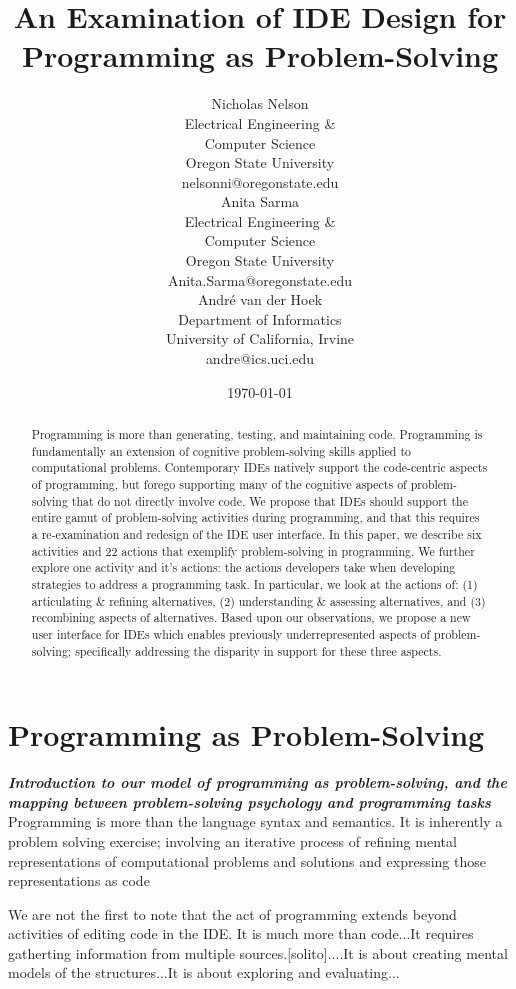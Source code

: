 \documentclass{ppig}
\title{An Examination of IDE Design for Programming as Problem-Solving}
\author{Nicholas Nelson \\
  Electrical Engineering \&\\ Computer Science \\
  Oregon State University \\
  nelsonni@oregonstate.edu \\
  \And
  Anita Sarma \\
  Electrical Engineering \&\\ Computer Science \\
  Oregon State University \\
  Anita.Sarma@oregonstate.edu \\
  \And
  André van der Hoek \\
  Department of Informatics \\
  University of California, Irvine \\
  andre@ics.uci.edu
}
\date{\today}
\newcommand{\bold}[1]{\textit{\textbf{\color{aoblue}#1}}} %
\begin{document}
\maketitle
\thispagestyle{empty}

\begin{abstract}

Programming is more than generating, testing, and maintaining code.
Programming is fundamentally an extension of cognitive problem-solving skills applied to computational problems.
Contemporary IDEs natively support the code-centric aspects of programming, but forego supporting many of the cognitive aspects of problem-solving that do not directly involve code.
We propose that IDEs should support the entire gamut of problem-solving activities during programming, and that this requires a re-examination and redesign of the IDE user interface.
In this paper, we describe six activities and 22 actions that exemplify problem-solving in programming.
We further explore one activity and it's actions: the actions developers take when developing strategies to address a programming task.
In particular, we look at the actions of: (1) articulating \& refining alternatives, (2) understanding \& assessing alternatives, and (3) recombining aspects of alternatives.
Based upon our observations, we propose a new user interface for IDEs which enables previously underrepresented aspects of problem-solving; specifically addressing the disparity in support for these three aspects. 
\end{abstract}

\section{Programming as Problem-Solving}

\bold{Introduction to our model of programming as problem-solving, and the mapping between problem-solving psychology and programming tasks}\\
Programming is more than the language syntax and semantics. It is inherently a problem solving exercise; involving an iterative process of refining mental representations of computational problems and solutions and expressing those representations as code~\cite{loksa2016programming}

We are not the first to note that the act of programming extends beyond activities of editing code in the IDE. It is much more than code...It requires gatherting information from multiple sources.[solito]....It is about creating mental models of the structures...It is about exploring and evaluating...
\end{document}
